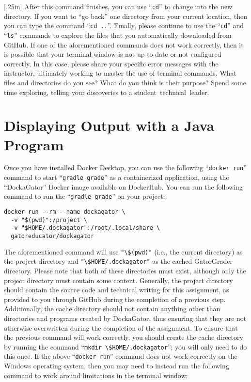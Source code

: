\documentclass[11pt]{article}
\newcommand{\command}[1]{``\lstinline{#1}''}
\newcommand{\program}[1]{\lstinline{#1}}
\newcommand{\step}[1]{``{#1}''}
\newcommand{\discuss}[1]{\null\hfill\LARGE{\faCommentO{}}\newline\scriptsize{\em{#1}}}
\begin{document}
\marginnote{\discuss{Use terminal commands}}[.25in] After this command finishes,
you can use \command{cd} to change into the new directory. If you want to
\step{go back} one directory from your current location, then you can type the
command \command{cd ..}.  Finally, please continue to use the \command{cd} and
\command{ls} commands to explore the files that you automatically downloaded
from GitHub. If one of the aforementioned commands does not work correctly, then
it is possible that your terminal window is not up-to-date or not configured
correctly. In this case, please share your specific error messages with the
instructor, ultimately working to master the use of terminal commands. What
files and directories do you see? What do you think is their purpose? Spend some
time exploring, telling your discoveries to a \mbox{student technical leader}.

\section*{Displaying Output with a Java Program}


Once you have installed Docker Desktop, you can use the following
\command{docker run} command to start \command{gradle grade} as a containerized
application, using the ``DockaGator'' Docker image available on DockerHub. You
can run the following command to run the \command{gradle grade} on your project:

\begin{verbatim}
docker run --rm --name dockagator \
  -v "$(pwd)":/project \
  -v "$HOME/.dockagator":/root/.local/share \
  gatoreducator/dockagator
\end{verbatim}

The aforementioned command will use \program{"\$(pwd)"} (i.e., the current
directory) as the project directory and \program{"\$HOME/.dockagator"} as the
cached GatorGrader directory. Please note that both of these directories must
exist, although only the project directory must contain some content. Generally,
the project directory should contain the source code and technical writing for
this assignment, as provided to you through GitHub during the completion of a
previous step. Additionally, the cache directory should not contain anything
other than directories and programs created by DockaGator, thus ensuring that
they are not otherwise overwritten during the completion of the assignment. To
ensure that the previous command will work correctly, you should create the
cache directory by running the command \command{mkdir \$HOME/.dockagator}; you
will only need to do this once. If the above \command{docker run} command does
not work correctly on the Windows operating system, then you may need to instead
run the following command to work around limitations in the terminal window:
\end{document}
